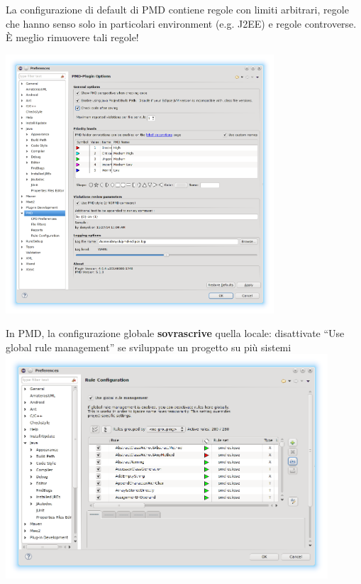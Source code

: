 \documentclass[presentation]{beamer}
\begin{document}
 {
	La configurazione di default di PMD contiene regole con limiti arbitrari, regole che hanno senso solo in particolari environment (e.g. J2EE) e regole controverse. È meglio rimuovere tali regole!
}

 {
	\centering
	\includegraphics[width=0.75\textwidth]{img/pmdconf}
}

 {
  In PMD, la configurazione globale \textbf{sovrascrive} quella locale: disattivate ``Use global rule management'' se sviluppate un progetto su più sistemi
  \centering
  \includegraphics[width=0.9\textwidth]{img/pmdconf1}
}
\end{document}
